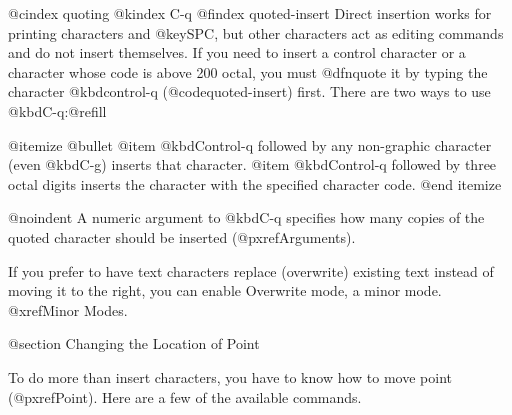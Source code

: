 {{@cindex quoting
@kindex C-q
@findex quoted-insert
  Direct insertion works for printing characters and @key{SPC}, but
other characters act as editing commands and do not insert themselves.
If you need to insert a control character or a character whose code is
above 200 octal, you must @dfn{quote} it by typing the character
@kbd{control-q} (@code{quoted-insert}) first.  There are two ways to use
@kbd{C-q}:@refill

@itemize @bullet
@item
@kbd{Control-q} followed by any non-graphic character (even @kbd{C-g})
inserts that character.
@item
@kbd{Control-q} followed by three octal digits inserts the character
with the specified character code.
@end itemize

@noindent
A numeric argument to @kbd{C-q} specifies how many copies of the quoted
character should be inserted (@pxref{Arguments}).

  If you prefer to have text characters replace (overwrite) existing
text instead of moving it to the right, you can enable Overwrite mode, a
minor mode.  @xref{Minor Modes}.

@section Changing the Location of Point

  To do more than insert characters, you have to know how to move point
(@pxref{Point}).  Here are a few of the available commands.

}}
